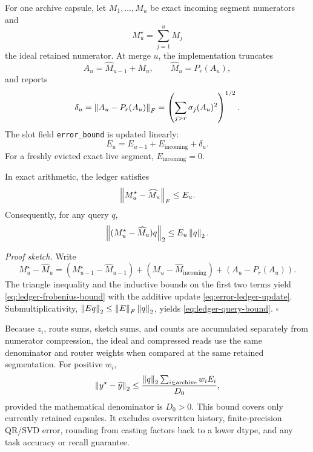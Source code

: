 For one archive capsule, let \(M_1,\ldots,M_u\) be exact incoming segment
numerators and
\begin{equation}
  M_u^\star=\sum_{j=1}^{u}M_j
\end{equation}
the ideal retained numerator.  At merge \(u\), the implementation truncates
\begin{equation}
  A_u=\widehat M_{u-1}+M_u,
  \qquad
  \widehat M_u=P_r(A_u),
\end{equation}
and reports
\begin{equation}
  \delta_u
  =
  \left\lVert A_u-P_r(A_u)\right\rVert_F
  =
  \left(
    \sum_{j>r}\sigma_j(A_u)^2
  \right)^{1/2}.
  \label{eq:merge-tail}
\end{equation}
The slot field \texttt{error\_bound} is updated linearly:
\begin{equation}
  E_u
  =
  E_{u-1}+E_{\mathrm{incoming}}+\delta_u.
  \label{eq:error-ledger-update}
\end{equation}
For a freshly evicted exact live segment,
\(E_{\mathrm{incoming}}=0\).

\begin{proposition}
\label{prop:error-ledger}
In exact arithmetic, the ledger satisfies
\begin{equation}
  \left\lVert M_u^\star-\widehat M_u\right\rVert_F\leq E_u.
  \label{eq:ledger-frobenius-bound}
\end{equation}
Consequently, for any query \(q\),
\begin{equation}
  \left\lVert (M_u^\star-\widehat M_u)q\right\rVert_2
  \leq E_u\left\lVert q\right\rVert_2.
  \label{eq:ledger-query-bound}
\end{equation}
\end{proposition}
\noindent\emph{Proof sketch.}
Write
\[
  M_u^\star-\widehat M_u
  =
  (M_{u-1}^\star-\widehat M_{u-1})
  +(M_u-\widehat M_{\mathrm{incoming}})
  +(A_u-P_r(A_u)).
\]
The triangle inequality and the inductive bounds on the first two terms yield
\eqref{eq:ledger-frobenius-bound} with the additive update
\eqref{eq:error-ledger-update}.  Submultiplicativity,
\(\left\lVert Eq\right\rVert_2\leq\left\lVert E\right\rVert_F\left\lVert q\right\rVert_2\), yields
\eqref{eq:ledger-query-bound}. \hfill\(\square\)

Because \(z_i\), route sums, sketch sums, and counts are accumulated separately
from numerator compression, the ideal and compressed reads use the same
denominator and router weights when compared at the same retained segmentation.
For positive \(w_i\),
\begin{equation}
  \left\lVert y^\star-\widehat y\right\rVert_2
  \leq
  \frac{
    \left\lVert q\right\rVert_2
    \sum_{i\in\mathrm{archive}}w_iE_i
  }{D_0},
  \label{eq:routed-output-error-bound}
\end{equation}
provided the mathematical denominator is \(D_0>0\).  This bound covers only
currently retained capsules.  It excludes overwritten history, finite-precision
QR/SVD error, rounding from casting factors back to a lower dtype, and any task
accuracy or recall guarantee.

